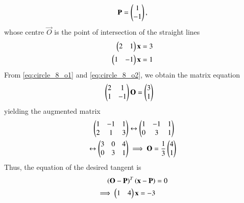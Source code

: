 \documentclass[journal,12pt,twocolumn]{IEEEtran}
\begin{document}
\begin{enumerate}[label=\arabic*]
\begin{equation}
\mathbf{P}=\begin{pmatrix}1\\ -1\end{pmatrix},
\end{equation}
whose centre $\vec{O}$ is the point of intersection of the straight lines
\begin{align} 
\label{eq:circle_8_o1}
\begin{pmatrix}2 & 1\end{pmatrix}\mathbf{x} &= 3
\\
\begin{pmatrix}1 & -1\end{pmatrix}\mathbf{x} &= 1
\label{eq:circle_8_o2}
\end{align} 
\solution From \eqref{eq:circle_8_o1} and \eqref{eq:circle_8_o2}, we obtain the matrix equation
\begin{align} 
\begin{pmatrix}2 & 1\\1 & -1\end{pmatrix}\mathbf{O} &= \begin{pmatrix}3 \\ 1\end{pmatrix}
\end{align} 
yielding the augmented matrix
\begin{align} 
\begin{pmatrix}1 & -1 & 1\\2 & 1 & 3\end{pmatrix}&\leftrightarrow\begin{pmatrix}1 & -1 & 1\\0 & 3 & 1\end{pmatrix}
\nonumber \\
\leftrightarrow\begin{pmatrix}3 & 0 & 4\\0 & 3 & 1\end{pmatrix}&\implies \mathbf{O} = \frac{1}{3}\begin{pmatrix}4 \\ 1\end{pmatrix}
\end{align} 
%
Thus, the equation of the desired tangent is 
\begin{align} 
\left(\mathbf{O}-\mathbf{P}\right)^T\left(\mathbf{x}-\mathbf{P}\right) &= 0
\nonumber \\
\implies
\begin{pmatrix}1 & 4\end{pmatrix}\mathbf{x}=-3
\end{align} 
\end{enumerate}
\end{document}
